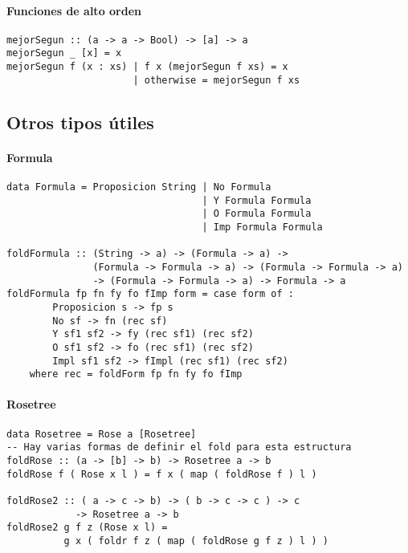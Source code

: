 \documentclass[10pt,a4paper]{article}
\begin{document}
\paragraph{Funciones de alto orden}
\begin{centrado}
	\begin{verbatim}
mejorSegun :: (a -> a -> Bool) -> [a] -> a
mejorSegun _ [x] = x
mejorSegun f (x : xs) | f x (mejorSegun f xs) = x
                      | otherwise = mejorSegun f xs
\end{verbatim}
\end{centrado}

\subsection{Otros tipos útiles}
\paragraph{Formula}
\begin{centrado}
	\begin{verbatim}
data Formula = Proposicion String | No Formula 
                                  | Y Formula Formula
                                  | O Formula Formula
                                  | Imp Formula Formula
                                  
foldFormula :: (String -> a) -> (Formula -> a) -> 
               (Formula -> Formula -> a) -> (Formula -> Formula -> a) 
               -> (Formula -> Formula -> a) -> Formula -> a
foldFormula fp fn fy fo fImp form = case form of :
		Proposicion s -> fp s
		No sf -> fn (rec sf)
		Y sf1 sf2 -> fy (rec sf1) (rec sf2)
		O sf1 sf2 -> fo (rec sf1) (rec sf2)
		Impl sf1 sf2 -> fImpl (rec sf1) (rec sf2)
	where rec = foldForm fp fn fy fo fImp
	\end{verbatim}
	\end{centrado}

\paragraph{Rosetree}
\begin{centrado}
	\begin{verbatim}
data Rosetree = Rose a [Rosetree]
-- Hay varias formas de definir el fold para esta estructura
foldRose :: (a -> [b] -> b) -> Rosetree a -> b
foldRose f ( Rose x l ) = f x ( map ( foldRose f ) l )
	
foldRose2 :: ( a -> c -> b) -> ( b -> c -> c ) -> c 
            -> Rosetree a -> b
foldRose2 g f z (Rose x l) = 
          g x ( foldr f z ( map ( foldRose g f z ) l ) )
		

	\end{verbatim}
	
	
\end{centrado}
\end{document}
